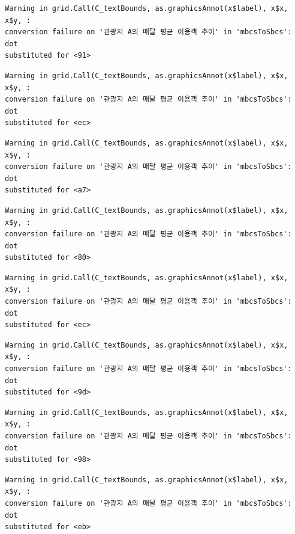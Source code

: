 \documentclass[
  letterpaper,
  DIV=11,
  numbers=noendperiod]{scrreprt}
\begin{document}
\begin{verbatim}
Warning in grid.Call(C_textBounds, as.graphicsAnnot(x$label), x$x, x$y, :
conversion failure on '관광지 A의 매달 평균 이용객 추이' in 'mbcsToSbcs': dot
substituted for <91>
\end{verbatim}

\begin{verbatim}
Warning in grid.Call(C_textBounds, as.graphicsAnnot(x$label), x$x, x$y, :
conversion failure on '관광지 A의 매달 평균 이용객 추이' in 'mbcsToSbcs': dot
substituted for <ec>
\end{verbatim}

\begin{verbatim}
Warning in grid.Call(C_textBounds, as.graphicsAnnot(x$label), x$x, x$y, :
conversion failure on '관광지 A의 매달 평균 이용객 추이' in 'mbcsToSbcs': dot
substituted for <a7>
\end{verbatim}

\begin{verbatim}
Warning in grid.Call(C_textBounds, as.graphicsAnnot(x$label), x$x, x$y, :
conversion failure on '관광지 A의 매달 평균 이용객 추이' in 'mbcsToSbcs': dot
substituted for <80>
\end{verbatim}

\begin{verbatim}
Warning in grid.Call(C_textBounds, as.graphicsAnnot(x$label), x$x, x$y, :
conversion failure on '관광지 A의 매달 평균 이용객 추이' in 'mbcsToSbcs': dot
substituted for <ec>
\end{verbatim}

\begin{verbatim}
Warning in grid.Call(C_textBounds, as.graphicsAnnot(x$label), x$x, x$y, :
conversion failure on '관광지 A의 매달 평균 이용객 추이' in 'mbcsToSbcs': dot
substituted for <9d>
\end{verbatim}

\begin{verbatim}
Warning in grid.Call(C_textBounds, as.graphicsAnnot(x$label), x$x, x$y, :
conversion failure on '관광지 A의 매달 평균 이용객 추이' in 'mbcsToSbcs': dot
substituted for <98>
\end{verbatim}

\begin{verbatim}
Warning in grid.Call(C_textBounds, as.graphicsAnnot(x$label), x$x, x$y, :
conversion failure on '관광지 A의 매달 평균 이용객 추이' in 'mbcsToSbcs': dot
substituted for <eb>
\end{verbatim}
\end{document}
